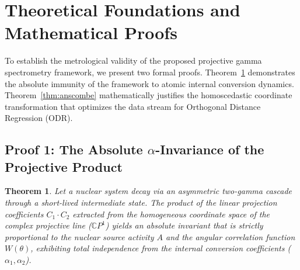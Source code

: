 \documentclass[review]{elsarticle} %
\newtheorem{theorem}{Theorem}
\begin{document}
\section{Theoretical Foundations and Mathematical Proofs}

To establish the metrological validity of the proposed projective gamma spectrometry framework, we present two formal proofs. Theorem~\ref{thm:alpha} demonstrates the absolute immunity of the framework to atomic internal conversion dynamics. Theorem~\ref{thm:anscombe} mathematically justifies the homoscedastic coordinate transformation that optimizes the data stream for Orthogonal Distance Regression (ODR).

\subsection{Proof 1: The Absolute $\alpha$-Invariance of the Projective Product}

\begin{theorem}\label{thm:alpha}
Let a nuclear system decay via an asymmetric two-gamma cascade through a short-lived intermediate state. The product of the linear projection coefficients $C_1 \cdot C_2$ extracted from the homogeneous coordinate space of the complex projective line ($\mathbb{C}P^1$) yields an absolute invariant that is strictly proportional to the nuclear source activity $A$ and the angular correlation function $W(\theta)$, exhibiting total independence from the internal conversion coefficients ($\alpha_1, \alpha_2$).
\end{theorem}
\end{document}
